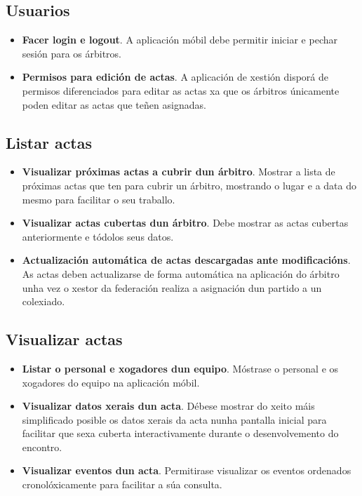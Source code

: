   \subsection{Usuarios}

    \begin{itemize}

    \item \textbf{Facer login e logout}.
    A aplicación móbil debe permitir iniciar e pechar sesión para os árbitros.

    \item \textbf{Permisos para edición de actas}.
    A aplicación de xestión disporá de permisos diferenciados para editar as 
actas xa que os árbitros únicamente poden editar as actas que teñen asignadas.

    \end{itemize}

  \subsection{Listar actas}

    \begin{itemize}

    \item \textbf{Visualizar próximas actas a cubrir dun árbitro}.
    Mostrar a lista de próximas actas que ten para cubrir un árbitro, mostrando 
o lugar e a data do mesmo para facilitar o seu traballo.

    \item \textbf{Visualizar actas cubertas dun árbitro}.
    Debe mostrar as actas cubertas anteriormente e tódolos seus datos.

    \item \textbf{Actualización automática de actas descargadas ante 
modificacións}.
    As actas deben actualizarse de forma automática na aplicación do árbitro 
unha vez o xestor da federación realiza a asignación dun partido a un colexiado.

    \end{itemize}

  \subsection{Visualizar actas}

    \begin{itemize}

    \item \textbf{Listar o personal e xogadores dun equipo}.
    Móstrase o personal e os xogadores do equipo na aplicación móbil.

    \item \textbf{Visualizar datos xerais dun acta}.
    Débese mostrar do xeito máis simplificado posible os datos xerais da acta 
nunha pantalla inicial para facilitar que sexa cuberta interactivamente durante 
o desenvolvemento do encontro.

    \item \textbf{Visualizar eventos dun acta}.
    Permitirase visualizar os eventos ordenados cronolóxicamente para facilitar 
a súa consulta.

    \end{itemize}

